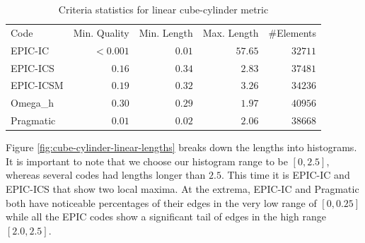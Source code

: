 \documentclass[3p,times,procedia,number]{elsarticle}
\begin{document}
\begin{table}
\caption{Criteria statistics for linear cube-cylinder metric}
\label{tab:cube-cylinder-linear-stats}
\begin{tabular}{lrrrr}
Code & Min. Quality & Min. Length & Max. Length & \#Elements\\
EPIC-IC    &$<0.001$&       $0.01$&      $57.65$&    $32711$\\
EPIC-ICS   &  $0.16$&       $0.34$&      $ 2.83$&    $37481$\\
EPIC-ICSM  &  $0.19$&       $0.32$&      $ 3.26$&    $34236$\\
Omega\_h   &  $0.30$&       $0.29$&      $ 1.97$&    $40956$\\
Pragmatic  &  $0.01$&       $0.02$&      $ 2.06$&    $38668$\\
\end{tabular}
\end{table}

Figure \ref{fig:cube-cylinder-linear-lengths} breaks down the
lengths into histograms.
It is important to note that we choose our histogram range to
be $[0,2.5]$, whereas several codes had lengths longer than $2.5$.
This time it is EPIC-IC and EPIC-ICS that show two local maxima.
At the extrema, EPIC-IC and Pragmatic both have noticeable
percentages of their edges in the very low range of $[0,0.25]$
while all the EPIC codes show a significant tail of edges
in the high range $[2.0,2.5]$.
\end{document}

